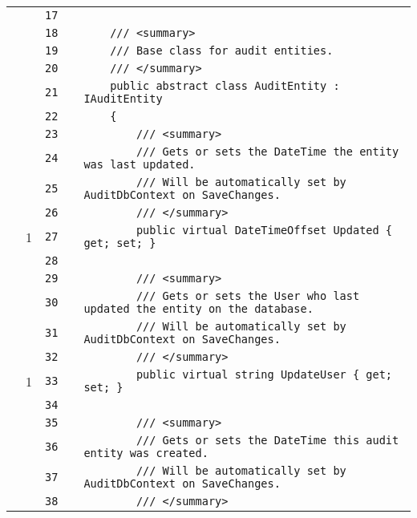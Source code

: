 \documentclass[a4paper,10pt]{article}
\begin{document}
\begin{longtable}[l]{lrrll}
\cellcolor{gray} &  & \verb~17~ & & \verb~~\\
\cellcolor{gray} &  & \verb~18~ & & \verb~    /// <summary>~\\
\cellcolor{gray} &  & \verb~19~ & & \verb~    /// Base class for audit entities.~\\
\cellcolor{gray} &  & \verb~20~ & & \verb~    /// </summary>~\\
\cellcolor{gray} &  & \verb~21~ & & \verb~    public abstract class AuditEntity : IAuditEntity~\\
\cellcolor{gray} &  & \verb~22~ & & \verb~    {~\\
\cellcolor{gray} &  & \verb~23~ & & \verb~        /// <summary>~\\
\cellcolor{gray} &  & \verb~24~ & & \verb~        /// Gets or sets the DateTime the entity was last updated.~\\
\cellcolor{gray} &  & \verb~25~ & & \verb~        /// Will be automatically set by AuditDbContext on SaveChanges.~\\
\cellcolor{gray} &  & \verb~26~ & & \verb~        /// </summary>~\\
\cellcolor{green} & 1 & \verb~27~ & & \verb~        public virtual DateTimeOffset Updated { get; set; }~\\
\cellcolor{gray} &  & \verb~28~ & & \verb~~\\
\cellcolor{gray} &  & \verb~29~ & & \verb~        /// <summary>~\\
\cellcolor{gray} &  & \verb~30~ & & \verb~        /// Gets or sets the User who last updated the entity on the database.~\\
\cellcolor{gray} &  & \verb~31~ & & \verb~        /// Will be automatically set by AuditDbContext on SaveChanges.~\\
\cellcolor{gray} &  & \verb~32~ & & \verb~        /// </summary>~\\
\cellcolor{green} & 1 & \verb~33~ & & \verb~        public virtual string UpdateUser { get; set; }~\\
\cellcolor{gray} &  & \verb~34~ & & \verb~~\\
\cellcolor{gray} &  & \verb~35~ & & \verb~        /// <summary>~\\
\cellcolor{gray} &  & \verb~36~ & & \verb~        /// Gets or sets the DateTime this audit entity was created.~\\
\cellcolor{gray} &  & \verb~37~ & & \verb~        /// Will be automatically set by AuditDbContext on SaveChanges.~\\
\cellcolor{gray} &  & \verb~38~ & & \verb~        /// </summary>~\\

\end{longtable}
\end{document}
